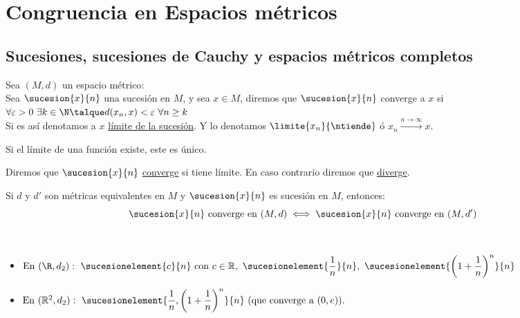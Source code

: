 \chapter{Congruencia en Espacios métricos}
	\section{Sucesiones, sucesiones de Cauchy y espacios métricos completos}
	     
	\begin{defi} Sea $(M,d)$ un espacio m\'etrico:\\
	     Sea $\sucesion{x}{n}$ una sucesi\'on en $M$, y sea $x\in M$, diremos que $\sucesion{x}{n}$ converge a $x$ si \\
	     $\forall \varepsilon>0\ \exists k\in \N\talque d(x_n,x)<\varepsilon\ \forall n\geq k$\\
	     Si es así denotamos a $x$ \underline{l\'imite de la sucesi\'on}. Y lo denotamos $\limite{x_n}{\ntiende}$ \'o $x_n\xrightarrow{n\rightarrow \infty}x$.
	\end{defi}
	     
	\begin{proposicion}
     	Si el l\'imite de una funci\'on existe, este es \'unico.
     \end{proposicion}
	     
     \begin{defi} Diremos que $\sucesion{x}{n}$ \underline{converge} si tiene l\'imite. En caso contrario diremos que \underline{diverge}.
     \end{defi}
	     
     \begin{observacion} Si $d$ y $d'$ son m\'etricas equivalentes en $M$ y $\sucesion{x}{n}$ es sucesi\'on en $M$, entonces:\\
	     \[\sucesion{x}{n}\mathrm{\ converge\ en\ }(M,d)\iff \sucesion{x}{n} \mathrm{\ converge\ en\ }(M,d')\]
     \end{observacion}
	
	\begin{ejem} \
		\begin{itemize}
		\item $\mathrm{En\ }(\R,d_2):\ \sucesionelement{c}{n}\mathrm{\  con\ }c\in \mathbb{R},\ \sucesionelement{\dfrac{1}{n}}{n},\ \sucesionelement{\left(1+\dfrac{1}{n}\right)^n}{n}$
\item  $\mathrm{En\ }(\mathbb{R}^2,d_2):\ \sucesionelement{\dfrac{1}{n},\left(1+\dfrac{1}{n}\right)^n}{n}\ \mathrm{(que\ converge\ a\ }(0,e)).$
		\end{itemize}
    \end{ejem}
	    
